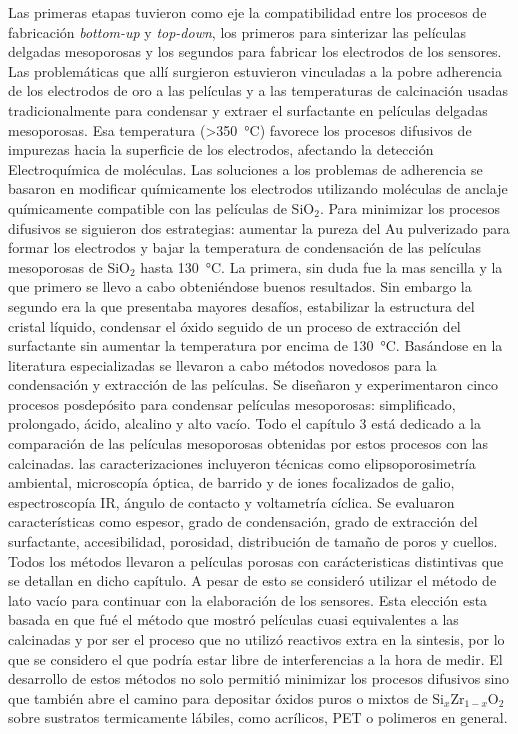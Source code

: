 Las primeras etapas tuvieron como eje la compatibilidad entre los procesos de fabricación \textit{bottom-up} y \textit{top-down}, los primeros para sinterizar las películas delgadas mesoporosas y los segundos para fabricar los electrodos de los sensores. Las problemáticas que allí surgieron estuvieron vinculadas a la pobre adherencia de los electrodos de oro a las películas y a las temperaturas de calcinación usadas tradicionalmente para condensar y extraer el surfactante en películas delgadas mesoporosas. Esa temperatura (>\SI{350}{\celsius}) favorece los procesos difusivos de impurezas hacia la superficie de los electrodos, afectando la detección Electroquímica de moléculas. Las soluciones a los problemas de adherencia se basaron en modificar químicamente los electrodos utilizando moléculas de anclaje químicamente compatible con las películas de SiO$_2$. Para minimizar los procesos difusivos se siguieron dos estrategias: aumentar la pureza del Au pulverizado para formar los electrodos y bajar la temperatura de condensación de las películas mesoporosas de SiO$_2$ hasta \SI{130}{\celsius}. La primera, sin duda fue la mas sencilla y la que primero se llevo a cabo obteniéndose buenos resultados. Sin embargo la segundo era la que presentaba mayores desafíos, estabilizar la estructura del cristal líquido, condensar el óxido seguido de un proceso de extracción del surfactante sin aumentar la temperatura por encima de \SI{130}{\celsius}. Basándose en la literatura especializadas se llevaron a cabo métodos novedosos para la condensación y extracción de las películas. Se diseñaron y experimentaron cinco procesos posdepósito para condensar películas mesoporosas: simplificado, prolongado, ácido, alcalino y alto vacío. Todo el capítulo 3 está dedicado a la comparación de las películas mesoporosas obtenidas por estos procesos con las calcinadas. las caracterizaciones incluyeron técnicas como elipsoporosimetría ambiental, microscopía óptica, de barrido y de iones focalizados de galio, espectroscopía IR, ángulo de contacto y voltametría cíclica. Se evaluaron características como espesor, grado de condensación, grado de extracción del surfactante, accesibilidad, porosidad, distribución de tamaño de poros y cuellos. Todos los métodos llevaron a películas porosas con carácteristicas distintivas que se detallan en dicho capítulo. A pesar de esto se consideró utilizar el método de lato vacío para continuar con la elaboración de los sensores. Esta elección esta basada en que fué el método que mostró películas cuasi equivalentes a las calcinadas y por ser el proceso que no utilizó reactivos extra en la sintesis, por lo que se considero el que podría estar libre de interferencias a la hora de medir. El desarrollo de estos métodos no solo permitió minimizar los procesos difusivos sino que también abre el camino para depositar óxidos puros o mixtos de Si$_x$Zr$_{1-x}$O$_2$ sobre sustratos termicamente lábiles, como acrílicos, PET o polimeros en general.

